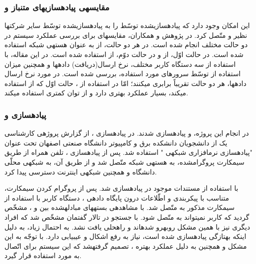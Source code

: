 \subsubsection{مقایسه\nf ی  پیاده\nf سازی\nf های متن\nf باز  و }


این امکان وجود دارد که   پیاده\nf سازی\nf شده توسّط  را به  پیاده\nf سازی\nf شده توسّط سایر شرکت\nf ها نظیر  و  متّصل کرد. در پژوهش  و همکاران\cite{ltecomp}، مقایسه\nf ای برای بررسی عملکرد سیستم  در دو حالت مختلف انجام شده است. در هر دو حالت، از  به عنوان هسته\nf ی شبکه استفاده شده است. در حالت اوّل، از  و در حالت دوّم، از  استفاده شده است. در این مقاله، با استفاده از سه دستگاه کاربر مختلف، نرخ ارسال(دریافت) داده\nf ها و همچنین میزان استفاده از  توسّط سرورهای مورد استفاده، بررسی شده است. در مورد نرخ ارسال داده\nf ها، هر دو حالت تقریباً برابری می\nf کنند؛ امّا در استفاده از ، حالت اوّل که از  استفاده می\nf کند، بسیار عملکرد بهتری دارد و از توان  کم\nf تری استفاده می\nf کند.

\subsubsection{پیاده\nf سازی  و }

در انجام این پروژه،  و  پیاده\nf سازی شدند. در پیاده\nf سازی \cite{weboai}، از گزارش پروژه\nf ی کارشناسی یک از دانشجویان  دانشکده برق و کامپیوتر دانشگاه صنعتی اصفهان تحت عنوان "پیاده\nf سازی نرم\nf افزاری شبکه\nf ی " استفاده شد. پس از پیاده\nf سازی ، تلفن همراه از طریق سیم\nf کارت پروگرام\nf شده، به هسته\nf ی شبکه متّصل شد و از طریق آن، به شبکه\nf ی محلّی دانشگاه و همچنین شبکه\nf ی اینترنت دسترسی پیدا کرد.

 با استفاده از مستندات موجود در \cite{websrs} پیاده\nf سازی شد. پس از پروگرام کردن سیم\nf کارت، متناسب با پیکربندی و اطّلاعات درون پایگاه داده\nf ی ، دستگاه کاربر با استفاده از سیم\nf کارت مذکور به  متّصل شد. با مشاهده\nf ی بسته\nf های مبادله\nf شده بین  و ، مشخّص گردید که کاربر نمی\nf تواند به  متّصل شود. با جستجو در تالار گفتمان  مشخّص شد که افراد دیگری نیز با همین مشکل روبه\nf رو شده\nf اند و راه\nf حلی یافت نشد. به احتمال زیاد، به دلیل این\nf که  به\nf تازگی پیاده\nf سازی شده است، نیاز به رفع اشکال و عیب\nf یابی دارد. با توجّه به این مشکل و همچنین به دلیل عملکرد بهتره ، تصمیم گرفته\nf شد که این سیستم برای اتّصال به  مورد استفاده قرار گیرد. 

